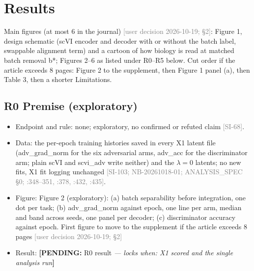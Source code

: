 \documentclass[11pt]{article}
\newcommand{\src}[1]{{\scriptsize\textcolor{gray}{[#1]}}}
\newcommand{\pending}[2]{{\color{BurntOrange}\textbf{[PENDING:} #1 \textit{--- locks when: #2}\textbf{]}}}
\begin{document}
\section{Results}
Main figures (at most 6 in the journal) \src{user decision 2026-10-19;  \S2}: Figure 1, design schematic (scVI encoder and decoder with or without the batch label, swappable alignment term) and a cartoon of how biology is read at matched batch removal b*; Figures 2--6 as listed under R0--R5 below. Cut order if the article exceeds 8 pages: Figure 2 to the supplement, then Figure 1 panel (a), then Table 3, then a shorter Limitations.

\subsection{R0 Premise (exploratory)}
\begin{itemize}
\item Endpoint and rule: none; exploratory, no confirmed or refuted claim \src{SI-68}.
\item Data: the per-epoch training histories saved in every X1 latent file (adv\_grad\_norm for the six adversarial arms, adv\_acc for the discriminator arm; plain scVI and scvi\_adv write neither) and the $\lambda = 0$ latents; no new fits, X1 fit logging unchanged \src{SI-103; NB-20261018-01; ANALYSIS\_SPEC \S0; \file{scvi_adversarial_plan.py}:348--351, :378, :432, :435}.
\item Figure: Figure 2 (exploratory): (a) batch separability before integration, one dot per task; (b) adv\_grad\_norm against epoch, one line per arm, median and band across seeds, one panel per decoder; (c) discriminator accuracy against epoch. First figure to move to the supplement if the article exceeds 8 pages \src{user decision 2026-10-19;  \S2}
\item Result: \pending{R0 result}{X1 scored and the single analysis run}
\end{itemize}
\end{document}
